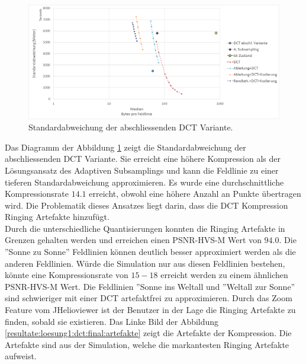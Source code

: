 \begin{figure}[!htbp]
	\center	\includegraphics[width=1\textwidth,keepaspectratio]{./pictures/resultate/loesung1/loesung1-12/resultate.png}
	\caption{Standardabweichung der abschliessenden DCT Variante.}	\label{resultate:loesung1:dct:abschliessend:standardabweichung}
\end{figure} 
Das Diagramm der Abbildung \ref{resultate:loesung1:dct:abschliessend:standardabweichung} zeigt die Standardabweichung der abschliessenden DCT Variante. Sie erreicht eine höhere Kompression als der Lösungsansatz des Adaptiven Subsamplings und kann die Feldlinie zu einer tieferen Standardabweichung approximieren. Es wurde eine durchschnittliche Kompressionsrate $14.1$ erreicht, obwohl eine höhere Anzahl an Punkte übertragen wird. Die Problematik dieses Ansatzes liegt darin, dass die DCT Kompression Ringing Artefakte hinzufügt.\\
Durch die unterschiedliche Quantisierungen konnten die Ringing Artefakte in Grenzen gehalten werden und erreichen einen PSNR-HVS-M  Wert von $94.0$. Die ''Sonne zu Sonne'' Feldlinien können deutlich besser approximiert werden als die anderen Feldlinien. Würde die Simulation nur aus diesen Feldlinien bestehen, könnte eine Kompressionsrate von $15-18$ erreicht werden zu einem ähnlichen PSNR-HVS-M Wert. Die Feldlinien ''Sonne ins Weltall und ''Weltall zur Sonne'' sind schwieriger mit einer DCT artefaktfrei zu approximieren.  Durch das Zoom Feature vom JHelioviewer ist der Benutzer in der Lage die Ringing Artefakte zu finden, sobald sie existieren. Das Linke Bild der Abbildung \ref{resultate:loesung1:dct:final:artefakte} zeigt die Artefakte der Kompression. Die Artefakte sind aus der Simulation, welche die markantesten Ringing Artefakte aufweist.

